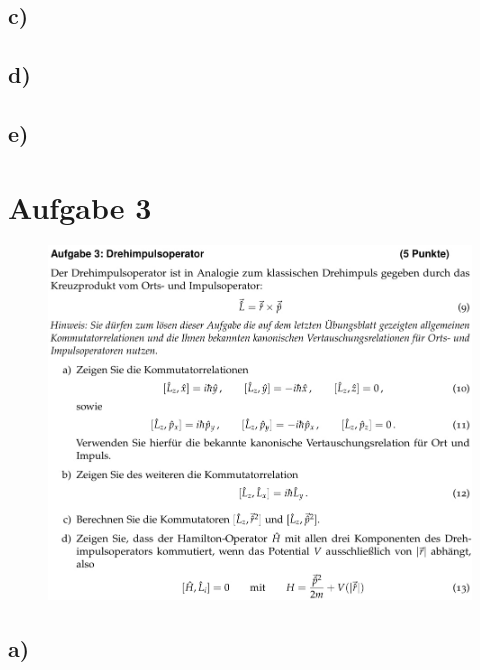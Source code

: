     \subsection{c)}

    \subsection{d)}

    \subsection{e)}


\section{Aufgabe 3}

    \begin{figure}[H]
        \centering
        \includegraphics[width=\textwidth]{images/Aufgabe3.jpg}
        \label{fig:3}
    \end{figure}

    \subsection{a)}

